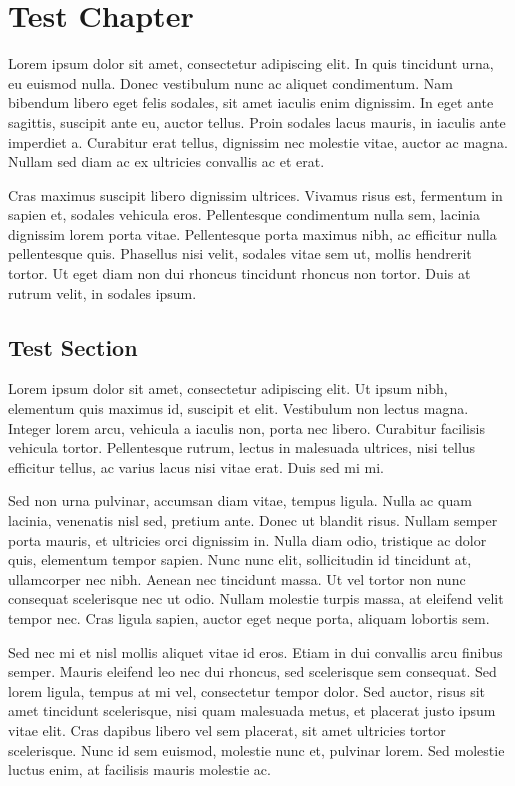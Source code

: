 
\chapter{Test Chapter}\label{ch:test}
Lorem ipsum dolor sit amet, consectetur adipiscing elit. 
In quis tincidunt urna, eu euismod nulla. 
Donec vestibulum nunc ac aliquet condimentum. 
Nam bibendum libero eget felis sodales, sit amet iaculis enim dignissim. 
In eget ante sagittis, suscipit ante eu, auctor tellus. 
Proin sodales lacus mauris, in iaculis ante imperdiet a. 
Curabitur erat tellus, dignissim nec molestie vitae, auctor ac magna. 
Nullam sed diam ac ex ultricies convallis ac et erat. \cite{test01}

Cras maximus suscipit libero dignissim ultrices. 
Vivamus risus est, fermentum in sapien et, sodales vehicula eros. 
Pellentesque condimentum nulla sem, lacinia dignissim lorem porta vitae. 
Pellentesque porta maximus nibh, ac efficitur nulla pellentesque quis. 
Phasellus nisi velit, sodales vitae sem ut, mollis hendrerit tortor. 
Ut eget diam non dui rhoncus tincidunt rhoncus non tortor. 
Duis at rutrum velit, in sodales ipsum.

\section{Test Section}\label{sec:test}
Lorem ipsum dolor sit amet, consectetur adipiscing elit. 
Ut ipsum nibh, elementum quis maximus id, suscipit et elit. 
Vestibulum non lectus magna. 
Integer lorem arcu, vehicula a iaculis non, porta nec libero. 
Curabitur facilisis vehicula tortor. 
Pellentesque rutrum, lectus in malesuada ultrices, nisi tellus efficitur tellus, ac varius lacus nisi vitae erat. 
Duis sed mi mi. 

Sed non urna pulvinar, accumsan diam vitae, tempus ligula. 
Nulla ac quam lacinia, venenatis nisl sed, pretium ante. 
Donec ut blandit risus. 
Nullam semper porta mauris, et ultricies orci dignissim in. 
Nulla diam odio, tristique ac dolor quis, elementum tempor sapien. 
Nunc nunc elit, sollicitudin id tincidunt at, ullamcorper nec nibh. 
Aenean nec tincidunt massa. 
Ut vel tortor non nunc consequat scelerisque nec ut odio. 
Nullam molestie turpis massa, at eleifend velit tempor nec. 
Cras ligula sapien, auctor eget neque porta, aliquam lobortis sem.

Sed nec mi et nisl mollis aliquet vitae id eros. 
Etiam in dui convallis arcu finibus semper. 
Mauris eleifend leo nec dui rhoncus, sed scelerisque sem consequat. 
Sed lorem ligula, tempus at mi vel, consectetur tempor dolor. 
Sed auctor, risus sit amet tincidunt scelerisque, nisi quam malesuada metus, et placerat justo ipsum vitae elit. 
Cras dapibus libero vel sem placerat, sit amet ultricies tortor scelerisque. 
Nunc id sem euismod, molestie nunc et, pulvinar lorem. 
Sed molestie luctus enim, at facilisis mauris molestie ac. 

